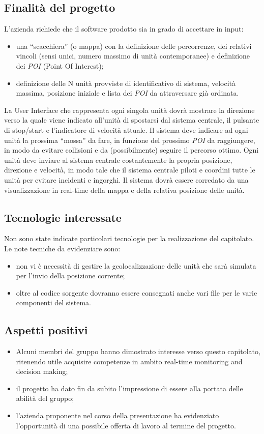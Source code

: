 \subsection{Finalità del progetto}
L’azienda richiede che il software prodotto sia in grado di accettare in input:
\begin{itemize}
    \item una “scacchiera” (o mappa) con la definizione delle percorrenze, dei relativi vincoli (sensi unici, numero massimo di unità contemporanee) e definizione dei \textit{POI} (Point Of Interest);
    \item definizione delle N unità provviste di identificativo di sistema, velocità massima, posizione iniziale e lista dei \textit{POI} da attraversare già ordinata.
\end{itemize}
La User Interface che rappresenta ogni singola unità dovrà mostrare la direzione verso la quale viene indicato all'unità di spostarsi dal sistema centrale, il pulsante di stop/start e l’indicatore di velocità attuale.
Il sistema deve indicare ad ogni unità la prossima “mossa” da fare, in funzione del prossimo \textit{POI} da raggiungere, in modo da evitare collisioni e da  (possibilmente) seguire il percorso ottimo.
Ogni unità deve inviare al sistema centrale costantemente la propria posizione, direzione e velocità, in modo tale che il sistema centrale piloti e coordini tutte le unità per evitare incidenti e ingorghi.
Il sistema dovrà essere corredato da una visualizzazione in real-time della mappa e della relativa posizione delle unità.

\subsection{Tecnologie interessate}
Non sono state indicate particolari tecnologie per la realizzazione del capitolato. Le note tecniche da evidenziare sono:
\begin{itemize}
    \item non vi è necessità di gestire la geolocalizzazione delle unità che sarà simulata per l’invio della posizione corrente;
    \item oltre al codice sorgente dovranno essere consegnati anche vari file  per le varie componenti del sistema.
\end{itemize}

\subsection{Aspetti positivi}
\begin{itemize}
    \item Alcuni membri del gruppo hanno dimostrato interesse verso questo capitolato, ritenendo utile acquisire competenze in ambito real-time monitoring and decision making;
    \item il progetto ha dato fin da subito l’impressione di essere alla portata delle abilità del gruppo;
    \item l’azienda proponente nel corso della presentazione ha evidenziato l’opportunità di una possibile offerta di lavoro al termine del progetto.
\end{itemize}

